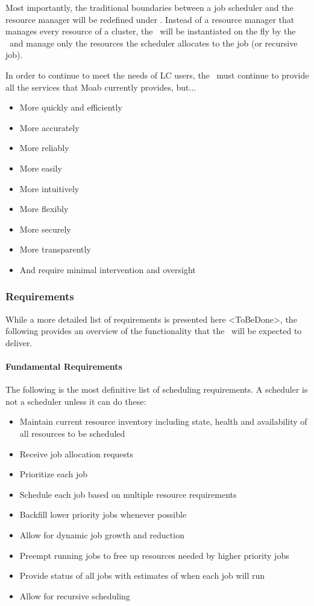 Most importantly, the traditional boundaries between a job scheduler
and the resource manager will be redefined under \ngrm.  Instead of a
resource manager that manages every resource of a cluster, the
\ngrmfull\ will be instantiated on the fly by the \ngjs\ and manage
only the resources the scheduler allocates to the job (or recursive
job).

In order to continue to meet the needs of LC users, the \ngjs\ must
continue to provide all the services that Moab currently provides,
but...
\begin{itemize}
  \item More quickly and efficiently
  \item More accurately
  \item More reliably
  \item More easily
  \item More intuitively
  \item More flexibly
  \item More securely
  \item More transparently
  \item And require minimal intervention and oversight
\end{itemize}

\subsubsection{Requirements}

While a more detailed list of requirements is presented here
<ToBeDone>, the following provides an overview of the functionality
that the \ngjs\ will be expected to deliver.

\paragraph{Fundamental Requirements}

The following is the most definitive list of scheduling requirements.
A scheduler is not a scheduler unless it can do these:

\begin{itemize}
  \item Maintain current resource inventory including state, health
    and availability of all resources to be scheduled
  \item Receive job allocation requests
  \item Prioritize each job
  \item Schedule each job based on multiple resource requirements
  \item Backfill lower priority jobs whenever possible
  \item Allow for dynamic job growth and reduction
  \item Preempt running jobs to free up resources needed by higher priority jobs
  \item Provide status of all jobs with estimates of when each job will run
  \item Allow for recursive scheduling
\end{itemize}

